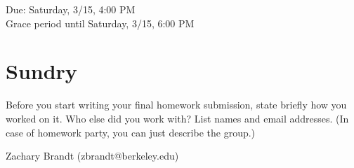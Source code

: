 \documentclass[11pt]{article}
\begin{document}
\maketitle
\fontsize{12}{15}\selectfont

\begin{center}
    Due: Saturday, 3/15, 4:00 PM \\
    Grace period until Saturday, 3/15, 6:00 PM \\
\end{center}

\section*{Sundry}
Before you start writing your final homework submission, state briefly how you worked on it.  Who else did you work with?  List names and email addresses.  (In case of homework party, you can just describe the group.)

\begin{center}
    Zachary Brandt (zbrandt@berkeley.edu)
\end{center}

\vspace{15pt}
\end{document}
